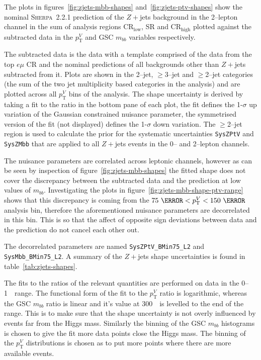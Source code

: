 The plots in figures~\ref{fig:zjets-mbb-shapes} and~\ref{fig:zjets-ptv-shapes}
show the nominal \textsc{Sherpa}~2.2.1 prediction of the $Z+$jets background in
the 2--lepton channel in the sum of analysis regions CR$_{\text{low}}$, SR and
CR$_{\text{high}}$ plotted against the subtracted data in the $p_{\mathrm{T}}^V$ and GSC
$m_{bb}$ variables respectively.


The subtracted data is the data with a template comprised of the data from the
top $e\mu$ CR and the nominal predictions of all backgrounds other than $Z+$jets
subtracted from it. Plots are shown in the 2--jet, $\geq$3--jet and $\geq$2--jet
categories (the sum of the two jet multiplicity based categories in the
analysis) and are plotted across all $p_{\mathrm{T}}^V$ bins of the analysis. The shape
uncertainty is derived by taking a fit to the ratio in the bottom pane of each
plot, the fit defines the 1-$\sigma$ up variation of the Gaussian constrained
nuisance parameter, the symmetrised version of the fit (not displayed) defines
the 1-$\sigma$ down variation. The $\geq$2--jet region is used to calculate the
prior for the systematic uncertainties \texttt{SysZPtV} and \texttt{SysZMbb}
that are applied to all $Z+$jets events in the 0-- and 2--lepton channels.

The nuisance parameters are correlated across leptonic channels, however as can
be seen by inspection of figure~\ref{fig:zjets-mbb-shapes} the fitted shape does
not cover the discrepancy between the subtracted data and the prediction at low
values of $m_{bb}$. Investigating the plots in
figure~\ref{fig:zjets-mbb-shape-ptv-range} shows that this discrepancy is coming
from the $75~\GeV < p_{\mathrm{T}}^V < 150~\GeV$ analysis bin, therefore the aforementioned
nuisance parameters are decorrelated in this bin. This is so that the affect of
opposite sign deviations between data and the prediction do not cancel each
other out.

The decorrelated parameters are named \texttt{SysZPtV\_BMin75\_L2} and
\texttt{SysMbb\_BMin75\_L2}. A summary of the $Z+$jets shape uncertainties is
found in table~\ref{tab:zjets-shapes}.


The fits to the ratios of the relevant quantities are performed on data in the
0--1~\TeV\ range. The functional form of the fit to the $ p_{\mathrm{T}}^V$
ratio is logarithmic, whereas the GSC $m_{bb}$ ratio is linear and it's value at
300~\GeV\ is levelled to the end of the range. This is to make sure that the
shape uncertainty is not overly influenced by events far from the Higgs mass.
Similarly the binning of the GSC $m_{bb}$ histograms is chosen to give the fit
more data points close the Higgs mass. The binning of the $p_{\mathrm{T}}^V$
distributions is chosen as to put more points where there are more available
events.

